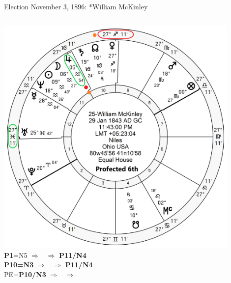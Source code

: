 \begin{frame}[t]{Election November 3, 1896: *William McKinley}
\begin{columns}[T, onlytextwidth]
\vspace{-1em}
{\includegraphics[width=0.9\textwidth]{charts/McKinley-Prof-6th.png}}
\textbf{\dgreen P1}=N5 
	$\Rightarrow$ \Jupiter\, $\Rightarrow$ \textbf{\dgreen P11/N4} \\
\textbf{\red P10=N3} 
	$\Rightarrow$  \Jupiter\, $\Rightarrow$  \textbf{\dgreen P11/N4} \\
PE=\textbf{\red P10/N3} 
	$\Rightarrow$  \Jupiter\, $\Rightarrow$  \textbf{}

\end{columns}
\end{frame}

